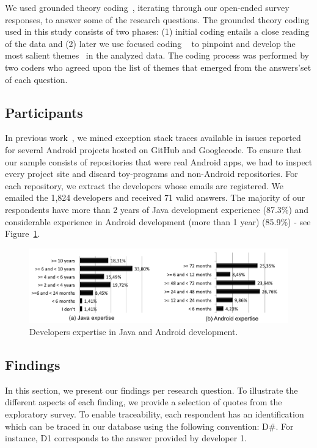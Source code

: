 We used grounded theory coding~\cite{charmaz2006}, iterating through our open-ended survey responses, to answer some of the research questions. The grounded theory coding used in this study consists of two phases: (1) initial coding entails a close reading of the data and (2) later we use focused coding ~\cite{charmaz2006} to pinpoint and develop the most salient themes~\cite{charmaz2006} in the analyzed data. The coding process was performed by two coders who agreed upon the list of themes that emerged from the answers'set of each question.

\subsection{Participants}

 In previous work~\cite{coelhoetal15}, we mined exception stack traces available in issues reported for several Android projects hosted on GitHub and Googlecode. To ensure that our sample consists of repositories that were real Android apps, we had to inspect every project site and discard toy-programs and non-Android repositories. For each repository, we extract the developers whose emails are registered. We emailed the 1,824 developers and received 71 valid answers. The majority of our respondents have more than 2 years of Java development experience (87.3\%) and  considerable experience in Android development (more than 1 year)  (85.9\%) - see Figure~\ref{fig:devexpertise}.

\begin{figure} \centering \includegraphics[scale=0.38]{charts/expertise_new.png}
\caption{Developers expertise in Java and Android development.}
\label{fig:devexpertise}
\end{figure}

\subsection{Findings}

In this section, we present our findings per research question. 
To illustrate the different aspects of each
finding, we provide a selection of quotes from the exploratory
survey. 
To enable traceability, each respondent has an identification
 which can be traced in our database using the following convention: 
D\#. For instance, D1 corresponds to the answer provided
 by developer 1.


